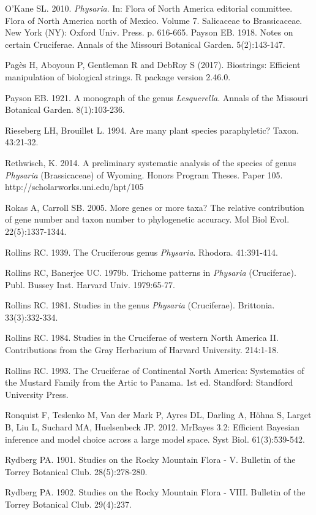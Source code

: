 O’Kane SL. 2010. \textit{Physaria}. In: Flora of North America editorial committee. Flora of North America north of Mexico. Volume 7. Salicaceae to Brassicaceae. New York (NY): Oxford Univ. Press. p. 616-665. 
Payson EB. 1918. Notes on certain Cruciferae. Annals of the Missouri Botanical Garden. 5(2):143-147.

Pagès H, Aboyoun P, Gentleman R and DebRoy S (2017). Biostrings: Efficient manipulation of biological strings. R package version 2.46.0. 

Payson EB. 1921. A monograph of the genus \textit{Lesquerella}. Annals of the Missouri Botanical Garden. 8(1):103-236.

Rieseberg LH, Brouillet L. 1994. Are many plant species paraphyletic? Taxon. 43:21-32.

Rethwisch, K. 2014. A preliminary systematic analysis of the species of genus \textit{Physaria} (Brassicaceae) of Wyoming. Honors Program Theses. Paper 105.
http://scholarworks.uni.edu/hpt/105

Rokas A, Carroll SB. 2005. More genes or more taxa? The relative contribution of gene number and taxon number to phylogenetic accuracy. Mol Biol Evol. 22(5):1337-1344.

Rollins RC. 1939. The Cruciferous genus \textit{Physaria}. Rhodora. 41:391-414.

Rollins RC, Banerjee UC. 1979b. Trichome patterns in \textit{Physaria} (Cruciferae). Publ. Bussey Inst. Harvard Univ. 1979:65-77.

Rollins RC. 1981. Studies in the genus \textit{Physaria} (Cruciferae). Brittonia. 33(3):332-334.

Rollins RC. 1984. Studies in the Cruciferae of western North America II. Contributions from the Gray Herbarium of Harvard University. 214:1-18.

Rollins RC. 1993. The Cruciferae of Continental North America: Systematics of the Mustard Family from the Artic to Panama. 1st ed. Standford: Standford University Press.

Ronquist F, Teslenko M, Van der Mark P, Ayres DL, Darling A, Höhna S, Larget B, Liu L, Suchard MA, Huelsenbeck JP. 2012. MrBayes 3.2: Efficient Bayesian inference and model choice across a large model space. Syst Biol. 61(3):539-542.

Rydberg PA. 1901. Studies on the Rocky Mountain Flora - V. Bulletin of the Torrey Botanical Club. 28(5):278-280.

Rydberg PA. 1902. Studies on the Rocky Mountain Flora - VIII. Bulletin of the Torrey Botanical Club. 29(4):237.

